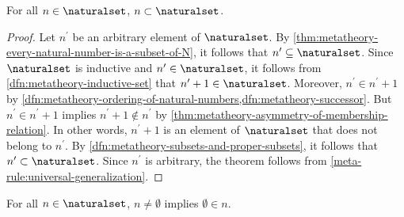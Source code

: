 \begin{thm}
     \label{thm:metatheory-every-natural-number-is-a-proper-subset-of-N}
    For all \( n \in \naturalset \), \( n \subset \naturalset \).
\end{thm}

\begin{proof}
    Let \( n^{\prime} \) be an arbitrary element of \( \naturalset \).
    By \cref{thm:metatheory-every-natural-number-is-a-subset-of-N}, it follows that \( n^{\prime} \subseteq \naturalset \).
    Since \( \naturalset \) is inductive and \( n^{\prime} \in \naturalset \), it follows from \cref{dfn:metatheory-inductive-set}
    that \( n^{\prime} + 1 \in \naturalset \).
    Moreover, \( n^{\prime} \in n^{\prime} + 1 \) by \cref{dfn:metatheory-ordering-of-natural-numbers,dfn:metatheory-successor}.
    But \( n^{\prime} \in n^{\prime} + 1 \) implies \( n^{\prime} + 1 \notin n^{\prime} \) by \cref{thm:metatheory-asymmetry-of-membership-relation}.
    In other words, \( n^{\prime} + 1 \) is an element of \( \naturalset \) that does not belong to \( n^{\prime} \).
    By \cref{dfn:metatheory-subsets-and-proper-subsets}, it follows that \( n^{\prime} \subset \naturalset \).
    Since \( n^{\prime} \) is arbitrary, the theorem follows from \cref{meta-rule:universal-generalization}.
\end{proof}

\begin{thm}
     \label{thm:metatheory-every-nonzero-natural-number-contains-the-empty-set}
    For all \( n \in \naturalset \), \( n \neq \emptyset \) implies \( \emptyset \in n \).
\end{thm}


